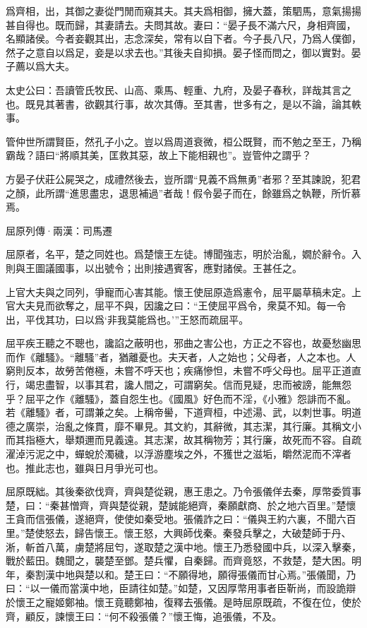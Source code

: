 \documentclass[12pt,a4paper]{ctexbook}
\begin{document}
爲齊相，出，其御之妻從門閒而窺其夫。其夫爲相御，擁大蓋，策駟馬，意氣揚揚甚自得也。既而歸，其妻請去。夫問其故。妻曰：“晏子長不滿六尺，身相齊國，名顯諸侯。今者妾觀其出，志念深矣，常有以自下者。今子長八尺，乃爲人僕御，然子之意自以爲足，妾是以求去也。”其後夫自抑損。晏子怪而問之，御以實對。晏子薦以爲大夫。\par
太史公曰：吾讀管氏牧民、山高、乘馬、輕重、九府，及晏子春秋，詳哉其言之也。既見其著書，欲觀其行事，故次其傳。至其書，世多有之，是以不論，論其軼事。\par
管仲世所謂賢臣，然孔子小之。豈以爲周道衰微，桓公既賢，而不勉之至王，乃稱霸哉？語曰“將順其美，匡救其惡，故上下能相親也”。豈管仲之謂乎？\par
方晏子伏莊公屍哭之，成禮然後去，豈所謂“見義不爲無勇”者邪？至其諫說，犯君之顏，此所謂“進思盡忠，退思補過”者哉！假令晏子而在，餘雖爲之執鞭，所忻慕焉。\par
屈原列傳·兩漢：司馬遷 \par
屈原者，名平，楚之同姓也。爲楚懷王左徒。博聞強志，明於治亂，嫺於辭令。入則與王圖議國事，以出號令；出則接遇賓客，應對諸侯。王甚任之。\par
上官大夫與之同列，爭寵而心害其能。懷王使屈原造爲憲令，屈平屬草稿未定。上官大夫見而欲奪之，屈平不與，因讒之曰：“王使屈平爲令，衆莫不知。每一令出，平伐其功，曰以爲‘非我莫能爲也。’”王怒而疏屈平。\par
屈平疾王聽之不聰也，讒諂之蔽明也，邪曲之害公也，方正之不容也，故憂愁幽思而作《離騷》。“離騷”者，猶離憂也。夫天者，人之始也；父母者，人之本也。人窮則反本，故勞苦倦極，未嘗不呼天也；疾痛慘怛，未嘗不呼父母也。屈平正道直行，竭忠盡智，以事其君，讒人間之，可謂窮矣。信而見疑，忠而被謗，能無怨乎？屈平之作《離騷》，蓋自怨生也。《國風》好色而不淫，《小雅》怨誹而不亂。若《離騷》者，可謂兼之矣。上稱帝嚳，下道齊桓，中述湯、武，以刺世事。明道德之廣崇，治亂之條貫，靡不畢見。其文約，其辭微，其志潔，其行廉。其稱文小而其指極大，舉類邇而見義遠。其志潔，故其稱物芳；其行廉，故死而不容。自疏濯淖污泥之中，蟬蛻於濁穢，以浮游塵埃之外，不獲世之滋垢，皭然泥而不滓者也。推此志也，雖與日月爭光可也。\par
屈原既絀。其後秦欲伐齊，齊與楚從親，惠王患之。乃令張儀佯去秦，厚幣委質事楚，曰：“秦甚憎齊，齊與楚從親，楚誠能絕齊，秦願獻商、於之地六百里。”楚懷王貪而信張儀，遂絕齊，使使如秦受地。張儀詐之曰：“儀與王約六裏，不聞六百里。”楚使怒去，歸告懷王。懷王怒，大興師伐秦。秦發兵擊之，大破楚師于丹、淅，斬首八萬，虜楚將屈匄，遂取楚之漢中地。懷王乃悉發國中兵，以深入擊秦，戰於藍田。魏聞之，襲楚至鄧。楚兵懼，自秦歸。而齊竟怒，不救楚，楚大困。明年，秦割漢中地與楚以和。楚王曰：“不願得地，願得張儀而甘心焉。”張儀聞，乃曰：“以一儀而當漢中地，臣請往如楚。”如楚，又因厚幣用事者臣靳尚，而設詭辯於懷王之寵姬鄭袖。懷王竟聽鄭袖，復釋去張儀。是時屈原既疏，不復在位，使於齊，顧反，諫懷王曰：“何不殺張儀？”懷王悔，追張儀，不及。\par
\end{document}
